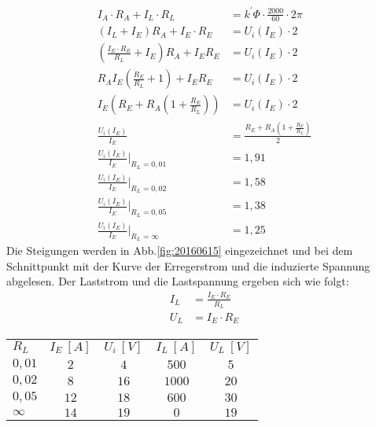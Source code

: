 \begin{solution}
\begin{enumerate}
\begin{align}
I_A \cdot R_A + I_L \cdot R_L &= k^{'} \Phi \cdot \frac{2000}{60} \cdot 2 \pi\\
(I_L + I_E) R_A + I_E \cdot R_E &= U_i(I_E) \cdot 2\\
\left (\frac{I_E \cdot R_E}{R_L} + I_E \right )R_A + I_E R_E &= U_i(I_E)\cdot 2\\
R_A I_E \left ( \frac{R_E}{R_L} + 1 \right ) + I_E R_E &= U_i(I_E)\cdot 2\\
I_E\left(R_E +R_A\left(1 + \frac{R_E}{R_L}\right )\right) &= U_i(I_E)\cdot 2\\
\frac{U_i(I_E)}{I_E} &= \frac{R_E +R_A\left(1 + \frac{R_E}{R_L}\right)}{2}\\
\frac{U_i(I_E)}{I_E}|_{R_L=0,01} &= 1,91\\
\frac{U_i(I_E)}{I_E}|_{R_L=0,02} &= 1,58\\
\frac{U_i(I_E)}{I_E}|_{R_L=0,05} &= 1,38\\
\frac{U_i(I_E)}{I_E}|_{R_L=\infty} &= 1,25
\end{align}
Die Steigungen werden in Abb.\ref{fig:20160615} eingezeichnet und bei dem Schnittpunkt mit der Kurve der Erregerstrom und die induzierte Spannung abgelesen. Der Laststrom und die Lastspannung ergeben sich wie folgt:
\begin{align}
I_L &= \frac{I_E \cdot R_E}{R_L}\\
U_L &= I_E \cdot R_E
\end{align}
\begin{tabular}{lcccc}
$R_L$   & $I_E~[A]$  & $U_i~[V]$ & $I_L~[A]$ & $U_L~[V]$\\
$0,01$  & $2$    & $4$   & $500$ & $5$\\
$0,02$  & $8$    & $16$  & $1000$& $20$\\
$0,05$  & $12$   & $18$  & $600$ & $30$\\
$\infty$& $14$   & $19$  & $0$   & $19$\\
\end{tabular}
\begin{figure}[H]
	\label{fig:20160615lsg25}
	\end{figure}
	\end{enumerate}
\end{solution}